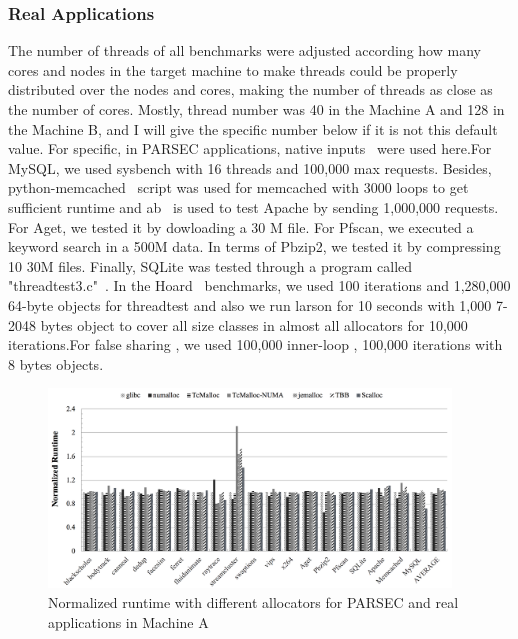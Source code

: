 \subsubsection{Real Applications}
\label{sec:synthetic}

The number of threads of all benchmarks were adjusted according how many cores and nodes in the target machine to make threads could be properly distributed over the nodes and cores, making the number of threads as close as the number of cores. Mostly, thread number was 40 in the Machine A and 128 in the Machine B, and I will give the specific number below if it is not this default value. For specific, in PARSEC applications, native inputs~\cite{parsec} were used here.For MySQL, we used sysbench with 16 threads and 100,000 max requests. Besides, python-memcached~\cite{memcached} script was used for memcached with 3000 loops to get sufficient runtime and ab~\cite{apachetest} is used to test Apache by sending 1,000,000 requests. For Aget, we tested it by dowloading a 30 M file. For Pfscan, we executed a keyword search in a 500M data. In terms of Pbzip2, we tested it by compressing 10 30M files. Finally, SQLite was tested through a program called "threadtest3.c"~\cite{sqlitetest}. In the Hoard~\cite{Hoard} benchmarks, we used 100 iterations and 1,280,000 64-byte objects for threadtest and also we run larson for 10 seconds with 1,000 7-2048 bytes object to cover all size classes in almost all allocators for 10,000 iterations.For false sharing , we used 100,000 inner-loop , 100,000 iterations with 8 bytes objects. 

\begin{figure}[H]
    \centering
    \includegraphics[width=\textwidth,height=200]{figure/2-node-parsec-perf.png}
    \caption{Normalized runtime with different allocators for PARSEC and real applications in Machine A}
    \label{2node-parsec-perf}
\end{figure}

